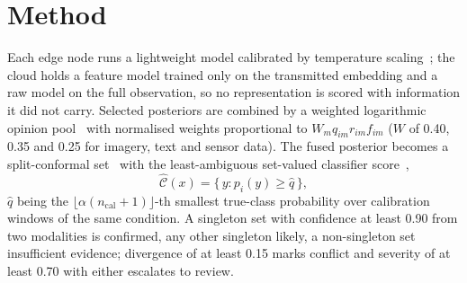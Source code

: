 \section{Method}
Each edge node runs a lightweight model calibrated by temperature scaling~\cite{guo2017}; the cloud holds a feature model trained only on the transmitted embedding and a raw model on the full observation, so no representation is scored with information it did not carry. Selected posteriors are combined by a weighted logarithmic opinion pool~\cite{heskes} with normalised weights proportional to $W_m q_{im} r_{im} f_{im}$ ($W$ of 0.40, 0.35 and 0.25 for imagery, text and sensor data). The fused posterior becomes a split-conformal set~\cite{vovk} with the least-ambiguous set-valued classifier score~\cite{sadinle},
\begin{equation}
\label{eq:conformal}
\hat{\mathcal C}(x)=\{\,y: p_i(y)\ge\hat q\,\},
\end{equation}
$\hat q$ being the $\lfloor \alpha(n_{\mathrm{cal}}+1)\rfloor$-th smallest true-class probability over calibration windows of the same condition. A singleton set with confidence at least 0.90 from two modalities is confirmed, any other singleton likely, a non-singleton set insufficient evidence; divergence of at least 0.15 marks conflict and severity of at least 0.70 with either escalates to review.

